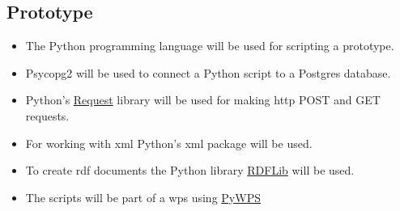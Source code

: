\subsection{Prototype}
\begin{itemize}
	\item The Python programming language will be used for scripting a prototype. 
	\item Psycopg2 will be used to connect a Python script to a Postgres database.
	\item Python's \href{http://docs.python-requests.org/en/latest/user/quickstart/}{Request} library will be used for making \ac{http} POST and GET requests. 
	\item For working with \ac{xml} Python's xml package will be used.
	\item To create \ac{rdf} documents the Python library \href{https://rdflib.readthedocs.org/en/stable/}{RDFLib} will be used. 
	\item The scripts will be part of a \ac{wps} using \href{http://pywps.wald.intevation.org/}{PyWPS} 
\end{itemize}









  

